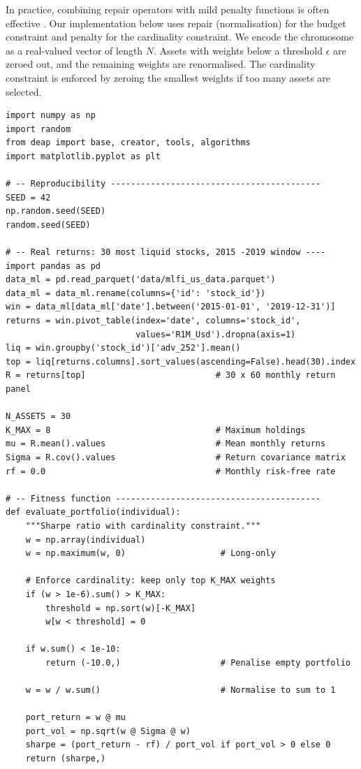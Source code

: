 In practice, combining repair operators with mild penalty functions is often effective \citep{Chang2000}. Our implementation below uses repair (normalisation) for the budget constraint and penalty for the cardinality constraint. We encode the chromosome as a real-valued vector of length $N$. Assets with weights below a threshold $\epsilon$ are zeroed out, and the remaining weights are renormalised. The cardinality constraint is enforced by zeroing the smallest weights if too many assets are selected.

\begin{verbatim}
import numpy as np
import random
from deap import base, creator, tools, algorithms
import matplotlib.pyplot as plt

# -- Reproducibility ------------------------------------------
SEED = 42
np.random.seed(SEED)
random.seed(SEED)

# -- Real returns: 30 most liquid stocks, 2015 -2019 window ----
import pandas as pd
data_ml = pd.read_parquet('data/mlfi_us_data.parquet')
data_ml = data_ml.rename(columns={'id': 'stock_id'})
win = data_ml[data_ml['date'].between('2015-01-01', '2019-12-31')]
returns = win.pivot_table(index='date', columns='stock_id',
                          values='R1M_Usd').dropna(axis=1)
liq = win.groupby('stock_id')['adv_252'].mean()
top = liq[returns.columns].sort_values(ascending=False).head(30).index
R = returns[top]                          # 30 x 60 monthly return panel

N_ASSETS = 30
K_MAX = 8                                 # Maximum holdings
mu = R.mean().values                      # Mean monthly returns
Sigma = R.cov().values                    # Return covariance matrix
rf = 0.0                                  # Monthly risk-free rate

# -- Fitness function -----------------------------------------
def evaluate_portfolio(individual):
    """Sharpe ratio with cardinality constraint."""
    w = np.array(individual)
    w = np.maximum(w, 0)                   # Long-only

    # Enforce cardinality: keep only top K_MAX weights
    if (w > 1e-6).sum() > K_MAX:
        threshold = np.sort(w)[-K_MAX]
        w[w < threshold] = 0

    if w.sum() < 1e-10:
        return (-10.0,)                    # Penalise empty portfolio

    w = w / w.sum()                        # Normalise to sum to 1

    port_return = w @ mu
    port_vol = np.sqrt(w @ Sigma @ w)
    sharpe = (port_return - rf) / port_vol if port_vol > 0 else 0
    return (sharpe,)


\end{verbatim}
